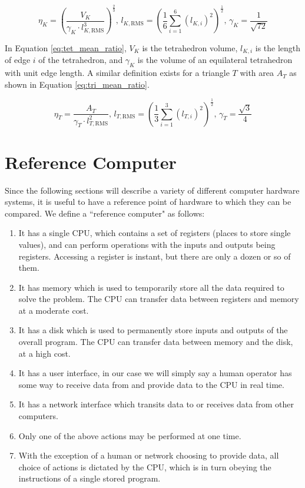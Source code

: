 \begin{equation} \label{eq:tet_mean_ratio}
\eta_K = \left(\frac{V_K}{\gamma_K\cdot l_{K,\text{RMS}}^3}\right)^{\frac23},\,
l_{K,\text{RMS}}=\left(\frac16\sum_{i=1}^6 \left(l_{K,i}\right)^2\right)^\frac12, \,
\gamma_K = \frac{1}{\sqrt{72}}
\end{equation}

In Equation \ref{eq:tet_mean_ratio},
$V_K$ is the tetrahedron volume, $l_{K,i}$ is the
length of edge $i$ of the tetrahedron, and $\gamma_K$ is the volume
of an equilateral tetrahedron with unit edge length.
A similar definition exists for a triangle $T$
with area $A_T$ as shown in Equation \ref{eq:tri_mean_ratio}.

\begin{equation} \label{eq:tri_mean_ratio}
\eta_T = \frac{A_T}{\gamma_T\cdot l_{T,\text{RMS}}^2},\,
l_{T,\text{RMS}}=\left(\frac13\sum_{i=1}^3 \left(l_{T,i}\right)^2\right)^\frac12, \,
\gamma_T = \frac{\sqrt{3}}{4}
\end{equation}

\section{Reference Computer}
\label{sec:ref_comp}

Since the following sections will describe a variety
of different computer hardware systems, it is useful to have a reference
point of hardware to which they can be compared.
We define a ``reference computer" as follows:

\begin{enumerate}
\item It has a single CPU, which contains a set
of registers (places to store single values),
and can perform operations with the inputs
and outputs being registers.
Accessing a register is instant, but there are
only a dozen or so of them.
\item It has memory which is used to temporarily store
all the data required to solve the problem.
The CPU can transfer data between registers
and memory at a moderate cost.
\item It has a disk which is used to permanently store
inputs and outputs of the overall program.
The CPU can transfer data between memory
and the disk, at a high cost.
\item It has a user interface, in our case
we will simply say a human operator has
some way to receive data from and provide
data to the CPU in real time.
\item It has a network interface which transits
data to or receives data from other computers.
\item Only one of the above actions may be
performed at one time.
\item With the exception of a human or network choosing
to provide data, all choice of actions is
dictated by the CPU, which is in turn obeying
the instructions of a single stored program.
\end{enumerate}


